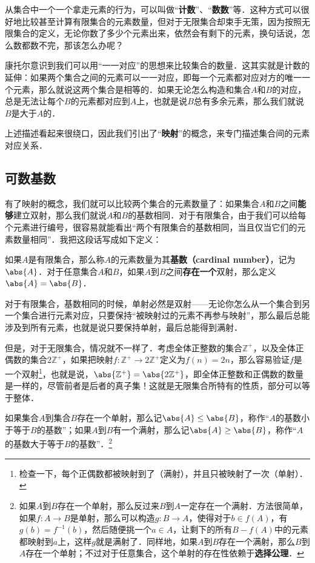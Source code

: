 从集合中一个一个拿走元素的行为，可以叫做“\textbf{计数}”、“\textbf{数数}”等．这种方式可以很好地比较甚至计算有限集合的元素数量，但对于无限集合却束手无策，因为按照无限集合的定义，无论你数了多少个元素出来，依然会有剩下的元素，换句话说，怎么数都数不完，那该怎么办呢？

康托尔意识到我们可以用“一一对应”的思想来比较集合的数量．这其实就是计数的延伸：如果两个集合之间的元素可以一一对应，即每一个元素都对应对方的唯一一个元素，那么就说这两个集合是相等的．如果无论怎么构造和集合$A$和$B$的对应，总是无法让每个$B$的元素都对应到$A$上，也就是说$B$总有多余元素，那么我们就说$B$是大于$A$的．

上述描述看起来很绕口，因此我们引出了“\textbf{映射}”的概念，来专门描述集合间的元素对应关系．



\subsection{可数基数}


有了映射的概念，我们就可以比较两个集合的元素数量了：如果集合$A$和$B$之间\textbf{能够}建立双射，那么我们就说$A$和$B$的基数相同．对于有限集合，由于我们可以给每个元素进行编号，很容易就能看出“两个有限集合的基数相同，当且仅当它们的元素数量相同”．我把这段话写成如下定义：

\begin{definition}{}
如果$A$是有限集合，那么称$A$的元素数量为其\textbf{基数（cardinal number）}，记为$\abs{A}$．对于任意集合$A$和$B$，如果$A$到$B$之间\textbf{存在一个}双射，那么定义$\abs{A}=\abs{B}$．
\end{definition}


对于有限集合，基数相同的时候，单射必然是双射——无论你怎么从一个集合到另一个集合进行元素对应，只要保持“被映射过的元素不再参与映射”，那么最后总能涉及到所有元素，也就是说只要保持单射，最后总能得到满射．

但是，对于无限集合，情况就不一样了．考虑全体正整数的集合$\mathbb{Z}^+$，以及全体正偶数的集合$2\mathbb{Z}^+$，如果把映射$f:\mathbb{Z}^+\rightarrow2\mathbb{Z}^+$定义为$f(n)=2n$，那么容易验证$f$是一个双射\footnote{检查一下，每个正偶数都被映射到了（满射），并且只被映射了一次（单射）．}，也就是说，$\abs{\mathbb{Z}^+}=\abs{2\mathbb{Z}^+}$，即全体正整数和正偶数的数量是一样的，尽管前者是后者的真子集！这就是无限集合所特有的性质，部分可以等于整体．

\begin{definition}{}
如果集合$A$到集合$B$存在一个单射，那么记$\abs{A}\leq\abs{B}$，称作“$A$的基数小于等于$B$的基数”；如果$A$到$B$有一个满射，那么记$\abs{A}\geq\abs{B}$，称作“$A$的基数大于等于$B$的基数”．\footnote{如果$A$到$B$存在一个单射，那么反过来$B$到$A$一定存在一个满射．方法很简单，如果$f:A\rightarrow B$是单射，那么可以构造$g:B\rightarrow A$，使得对于$b\in f(A)$，有$g(b)=f^{-1}(b)$，然后随便挑一个$a\in A$，让剩下的所有$B-f(A)$中的元素都映射到$a$上，这样$g$就是满射了．同样地，如果$A$到$B$存在一个满射，那么$B$到$A$存在一个单射；不过对于任意集合，这个单射的存在性依赖于\textbf{选择公理}．}
\end{definition}

